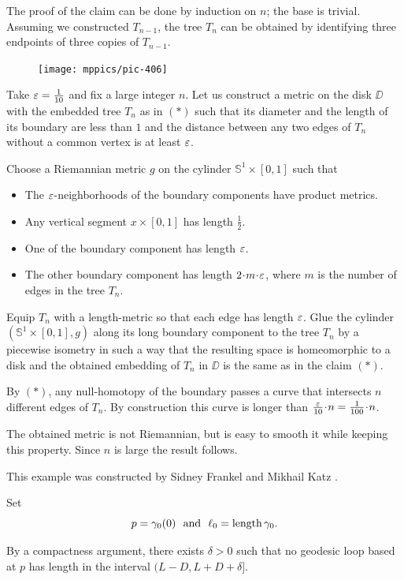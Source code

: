 The proof of the claim can be done by induction on $n$; the base is trivial.
Assuming we constructed $T_{n-1}$, the tree $T_n$ can be obtained by identifying three endpoints of three copies of $T_{n-1}$.

\begin{figure}[h!]
\vskip0mm
\centering
\texttt{[image: mppics/pic-406]}
\end{figure}

Take $\varepsilon=\tfrac1{10}$ and fix a large integer $n$.
Let us construct a metric on the disk $\DD$ with the embedded tree $T_n$ as in $({*})$ such that
its diameter and the length of its boundary are less than $1$
and  
the distance between any two edges of $T_n$ without a common vertex 
is at least $\varepsilon$.

Choose a Riemannian metric $g$ on the cylinder $\mathbb S^1\times [0,1]$ such that
\begin{itemize}
\item The $\varepsilon$-neighborhoods of the boundary components 
have product metrics.
\item Any vertical segment $x\times[0,1]$ has length $\tfrac 12$.
\item One of the boundary component has length $\varepsilon$.
\item The other boundary component has length $2\cdot m\cdot \eps$, 
where $m$ is the number of edges in the tree $T_n$.
\end{itemize}
Equip $T_n$ with a length-metric so that each edge has length $\varepsilon$.
Glue the cylinder $(\mathbb S^1\times [0,1],g)$ along its long boundary component to the tree $T_n$ by a piecewise isometry 
in such a way that the resulting space is homeomorphic to a disk and the obtained embedding of $T_n$ in $\DD$ is the same as in the claim $({*})$.

By $({*})$, any null-homotopy of the boundary passes a curve that intersects $n$ different edges of $T_n$.
By construction this curve is longer than $\tfrac{\eps}{10}\cdot n=\tfrac{1}{100}\cdot n$.

The obtained metric is not Riemannian, but is easy to smooth it while keeping this property.
Since $n$ is large the result follows.
\qeds
 
This example was constructed by Sidney Frankel and Mikhail Katz \cite{frankel-katz}.
 

Set 
\[p=\gamma_0(0)\ \ \text{and}\ \  \ell_0=\length\gamma_0.\]

By a compactness argument,
there exists $\delta>0$ 
such that no geodesic loop based at $p$ has length in the interval $(L-D, L+D+\delta]$. 

